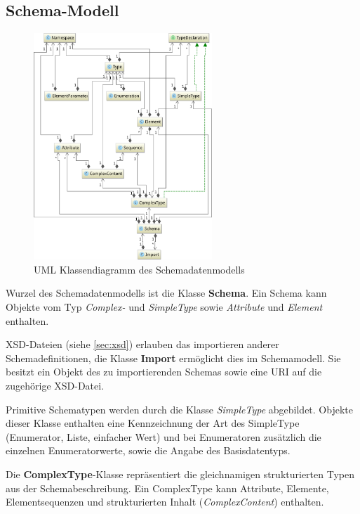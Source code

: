 \subsection{Schema-Modell}
\label{sec:schema_model}

\begin{figure}[t]
    \centering
    \includegraphics[width=0.6\textwidth]{resources/typemodel}
    \caption{UML Klassendiagramm des Schemadatenmodells}
    \label{fig:schema_model}
\end{figure}

Wurzel des Schemadatenmodells ist die Klasse \textbf{Schema}. Ein Schema kann Objekte vom Typ \emph{Complex-} und \emph{SimpleType} sowie \emph{Attribute} und \emph{Element} enthalten.

XSD-Dateien (siehe \cref{sec:xsd}) erlauben das importieren anderer Schemadefinitionen, die Klasse \textbf{Import} ermöglicht dies im Schemamodell. Sie besitzt ein Objekt des zu importierenden Schemas sowie eine URI auf die zugehörige XSD-Datei.

Primitive Schematypen werden durch die Klasse \emph{SimpleType} abgebildet. Objekte dieser Klasse enthalten eine Kennzeichnung der Art des SimpleType (Enumerator, Liste, einfacher Wert) und bei Enumeratoren zusätzlich die einzelnen Enumeratorwerte, sowie die Angabe des Basisdatentyps.

Die \textbf{ComplexType}-Klasse repräsentiert die gleichnamigen strukturierten Typen aus der Schemabeschreibung. 
Ein ComplexType kann Attribute, Elemente, Elementsequenzen und strukturierten Inhalt (\emph{ComplexContent}) enthalten.

